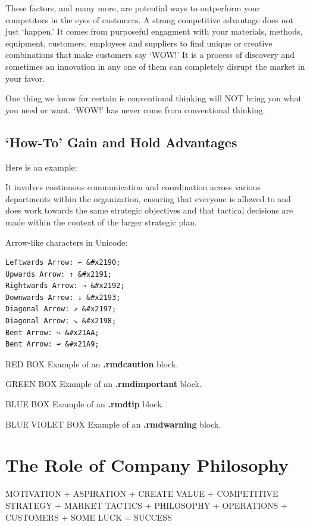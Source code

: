 \documentclass[
]{book}
\begin{document}
These factors, and many more, are potential ways to outperform your competitors in the eyes of customers. A strong competitive advantage does not just `happen.' It comes from purposeful engagment with your materials, methods, equipment, customers, employees and suppliers to find unique or creative combinations that make customers say `WOW!' It is a process of discovery and sometimes an innovation in any one of them can completely disrupt the market in your favor.

One thing we know for certain is conventional thinking will NOT bring you what you need or want. `WOW!' has never come from conventional thinking.

\hypertarget{how-to-gain-and-hold-advantages}{%
\section{`How-To' Gain and Hold Advantages}\label{how-to-gain-and-hold-advantages}}

Here is an example:

It involves continuous communication and coordination across various departments within the organization, ensuring that everyone is allowed to and does work towards the same strategic objectives and that tactical decisions are made within the context of the larger strategic plan.

Arrow-like characters in Unicode:

\begin{verbatim}
Leftwards Arrow: ← &#x2190;
Upwards Arrow: ↑ &#x2191;
Rightwards Arrow: → &#x2192;
Downwards Arrow: ↓ &#x2193;
Diagonal Arrow: ↗ &#x2197;
Diagonal Arrow: ↘ &#x2198;
Bent Arrow: ↪ &#x21AA;
Bent Arrow: ↩ &#x21A9;
\end{verbatim}

RED BOX Example of an \textbf{.rmdcaution} block.

GREEN BOX Example of an \textbf{.rmdimportant} block.

BLUE BOX Example of an \textbf{.rmdtip} block.

BLUE VIOLET BOX Example of an \textbf{.rmdwarning} block.

\hypertarget{the-role-of-company-philosophy}{%
\chapter{The Role of Company Philosophy}\label{the-role-of-company-philosophy}}

{MOTIVATION}
{+}
{ASPIRATION}
{+}
{CREATE VALUE}
{+}
{COMPETITIVE STRATEGY }
{+}
{MARKET TACTICS}
{+}
{PHILOSOPHY}
{+}
{OPERATIONS}
{+}
{CUSTOMERS}
{+}
{SOME LUCK}
{=}
{SUCCESS}
\end{document}
